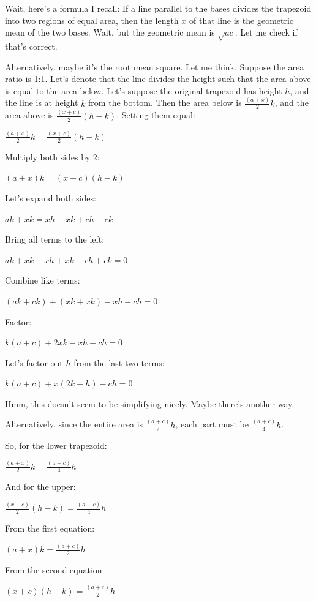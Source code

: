 \begin{tcolorbox}[
  title=Multiagent Collaborative Reasoning Trace Data Sample,
  breakable,
  colback=white,
  colframe=black
]
Wait, here's a formula I recall: If a line parallel to the bases divides the trapezoid into two regions of equal area, then the length \( x \) of that line is the geometric mean of the two bases. Wait, but the geometric mean is \( \sqrt{a c} \). Let me check if that's correct.

Alternatively, maybe it's the root mean square. Let me think. Suppose the area ratio is 1:1. Let’s denote that the line divides the height such that the area above is equal to the area below. Let’s suppose the original trapezoid has height \( h \), and the line is at height \( k \) from the bottom. Then the area below is \( \frac{(a + x)}{2}k \), and the area above is \( \frac{(x + c)}{2}(h - k) \). Setting them equal:

\( \frac{(a + x)}{2}k = \frac{(x + c)}{2}(h - k) \)

Multiply both sides by 2:

\( (a + x)k = (x + c)(h - k) \)

Let’s expand both sides:

\( a k + x k = x h - x k + c h - c k \)

Bring all terms to the left:

\( a k + x k - x h + x k - c h + c k = 0 \)

Combine like terms:

\( (a k + c k) + (x k + x k) - x h - c h = 0 \)

Factor:

\( k(a + c) + 2x k - x h - c h = 0 \)

Let’s factor out \( h \) from the last two terms:

\( k(a + c) + x(2k - h) - c h = 0 \)

Hmm, this doesn't seem to be simplifying nicely. Maybe there's another way.

Alternatively, since the entire area is \( \frac{(a + c)}{2} h \), each part must be \( \frac{(a + c)}{4} h \).

So, for the lower trapezoid:

\( \frac{(a + x)}{2} k = \frac{(a + c)}{4} h \)

And for the upper:

\( \frac{(x + c)}{2} (h - k) = \frac{(a + c)}{4} h \)

From the first equation:

\( (a + x)k = \frac{(a + c)}{2} h \)

From the second equation:

\( (x + c)(h - k) = \frac{(a + c)}{2} h \)


\end{tcolorbox}
